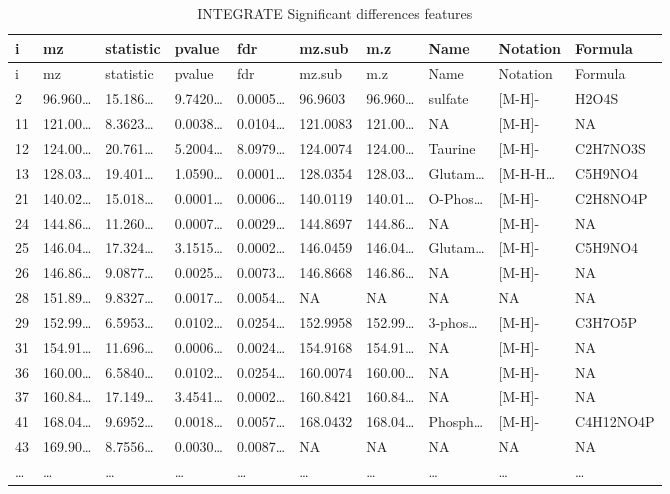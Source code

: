 \documentclass[
]{article}
\begin{document}
\begin{longtable}[]{@{}llllllllll@{}}
\caption{\label{tab:INTEGRATE-Significant-differences-features}INTEGRATE Significant differences features}\tabularnewline
\toprule
i & mz & statistic & pvalue & fdr & mz.sub & m.z & Name & Notation & Formula\tabularnewline
\midrule
\endfirsthead
\toprule
i & mz & statistic & pvalue & fdr & mz.sub & m.z & Name & Notation & Formula\tabularnewline
\midrule
\endhead
2 & 96.960\ldots{} & 15.186\ldots{} & 9.7420\ldots{} & 0.0005\ldots{} & 96.9603 & 96.960\ldots{} & sulfate & {[}M-H{]}- & H2O4S\tabularnewline
11 & 121.00\ldots{} & 8.3623\ldots{} & 0.0038\ldots{} & 0.0104\ldots{} & 121.0083 & 121.00\ldots{} & NA & {[}M-H{]}- & NA\tabularnewline
12 & 124.00\ldots{} & 20.761\ldots{} & 5.2004\ldots{} & 8.0979\ldots{} & 124.0074 & 124.00\ldots{} & Taurine & {[}M-H{]}- & C2H7NO3S\tabularnewline
13 & 128.03\ldots{} & 19.401\ldots{} & 1.0590\ldots{} & 0.0001\ldots{} & 128.0354 & 128.03\ldots{} & Glutam\ldots{} & {[}M-H-H\ldots{} & C5H9NO4\tabularnewline
21 & 140.02\ldots{} & 15.018\ldots{} & 0.0001\ldots{} & 0.0006\ldots{} & 140.0119 & 140.01\ldots{} & O-Phos\ldots{} & {[}M-H{]}- & C2H8NO4P\tabularnewline
24 & 144.86\ldots{} & 11.260\ldots{} & 0.0007\ldots{} & 0.0029\ldots{} & 144.8697 & 144.86\ldots{} & NA & {[}M-H{]}- & NA\tabularnewline
25 & 146.04\ldots{} & 17.324\ldots{} & 3.1515\ldots{} & 0.0002\ldots{} & 146.0459 & 146.04\ldots{} & Glutam\ldots{} & {[}M-H{]}- & C5H9NO4\tabularnewline
26 & 146.86\ldots{} & 9.0877\ldots{} & 0.0025\ldots{} & 0.0073\ldots{} & 146.8668 & 146.86\ldots{} & NA & {[}M-H{]}- & NA\tabularnewline
28 & 151.89\ldots{} & 9.8327\ldots{} & 0.0017\ldots{} & 0.0054\ldots{} & NA & NA & NA & NA & NA\tabularnewline
29 & 152.99\ldots{} & 6.5953\ldots{} & 0.0102\ldots{} & 0.0254\ldots{} & 152.9958 & 152.99\ldots{} & 3-phos\ldots{} & {[}M-H{]}- & C3H7O5P\tabularnewline
31 & 154.91\ldots{} & 11.696\ldots{} & 0.0006\ldots{} & 0.0024\ldots{} & 154.9168 & 154.91\ldots{} & NA & {[}M-H{]}- & NA\tabularnewline
36 & 160.00\ldots{} & 6.5840\ldots{} & 0.0102\ldots{} & 0.0254\ldots{} & 160.0074 & 160.00\ldots{} & NA & {[}M-H{]}- & NA\tabularnewline
37 & 160.84\ldots{} & 17.149\ldots{} & 3.4541\ldots{} & 0.0002\ldots{} & 160.8421 & 160.84\ldots{} & NA & {[}M-H{]}- & NA\tabularnewline
41 & 168.04\ldots{} & 9.6952\ldots{} & 0.0018\ldots{} & 0.0057\ldots{} & 168.0432 & 168.04\ldots{} & Phosph\ldots{} & {[}M-H{]}- & C4H12NO4P\tabularnewline
43 & 169.90\ldots{} & 8.7556\ldots{} & 0.0030\ldots{} & 0.0087\ldots{} & NA & NA & NA & NA & NA\tabularnewline
\ldots{} & \ldots{} & \ldots{} & \ldots{} & \ldots{} & \ldots{} & \ldots{} & \ldots{} & \ldots{} & \ldots{}\tabularnewline
\bottomrule
\end{longtable}
\end{document}
